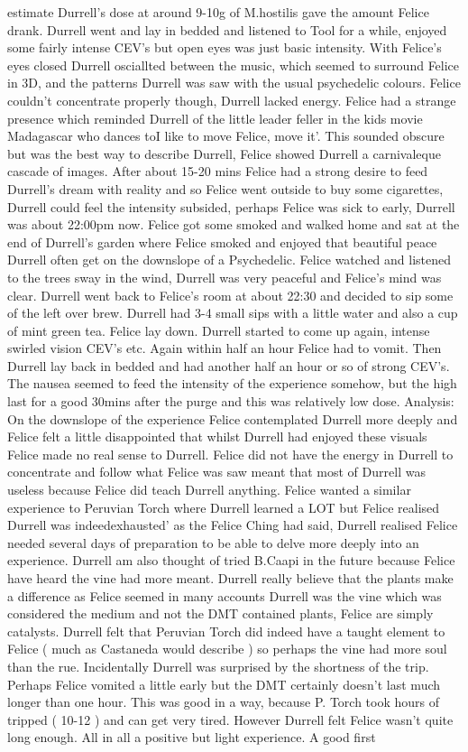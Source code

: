 \documentclass[12pt]{book}
\begin{document}
estimate Durrell's dose at around 9-10g of M.hostilis gave the amount Felice drank. Durrell went and lay in bedded and listened to Tool for a while, enjoyed some fairly intense CEV's but open eyes was just basic intensity. With Felice's eyes closed Durrell osciallted between the music, which seemed to surround Felice in 3D, and the patterns Durrell was saw with the usual psychedelic colours. Felice couldn't concentrate properly though, Durrell lacked energy. Felice had a strange presence which reminded Durrell of the little leader feller in the kids movie Madagascar who dances toI like to move Felice, move it'. This sounded obscure but was the best way to describe Durrell, Felice showed Durrell a carnivaleque cascade of images. After about 15-20 mins Felice had a strong desire to feed Durrell's dream with reality and so Felice went outside to buy some cigarettes, Durrell could feel the intensity subsided, perhaps Felice was sick to early, Durrell was about 22:00pm now. Felice got some smoked and walked home and sat at the end of Durrell's garden where Felice smoked and enjoyed that beautiful peace Durrell often get on the downslope of a Psychedelic. Felice watched and listened to the trees sway in the wind, Durrell was very peaceful and Felice's mind was clear. Durrell went back to Felice's room at about 22:30 and decided to sip some of the left over brew. Durrell had 3-4 small sips with a little water and also a cup of mint green tea. Felice lay down. Durrell started to come up again, intense swirled vision CEV's etc. Again within half an hour Felice had to vomit. Then Durrell lay back in bedded and had another half an hour or so of strong CEV's. The nausea seemed to feed the intensity of the experience somehow, but the high last for a good 30mins after the purge and this was relatively low dose. Analysis: On the downslope of the experience Felice contemplated Durrell more deeply and Felice felt a little disappointed that whilst Durrell had enjoyed these visuals Felice made no real sense to Durrell. Felice did not have the energy in Durrell to concentrate and follow what Felice was saw meant that most of Durrell was useless because Felice did teach Durrell anything. Felice wanted a similar experience to Peruvian Torch where Durrell learned a LOT but Felice realised Durrell was indeedexhausted' as the Felice Ching had said, Durrell realised Felice needed several days of preparation to be able to delve more deeply into an experience. Durrell am also thought of tried B.Caapi in the future because Felice have heard the vine had more meant. Durrell really believe that the plants make a difference as Felice seemed in many accounts Durrell was the vine which was considered the medium and not the DMT contained plants, Felice are simply catalysts. Durrell felt that Peruvian Torch did indeed have a taught element to Felice ( much as Castaneda would describe ) so perhaps the vine had more soul than the rue. Incidentally Durrell was surprised by the shortness of the trip. Perhaps Felice vomited a little early but the DMT certainly doesn't last much longer than one hour. This was good in a way, because P. Torch took hours of tripped ( 10-12 ) and can get very tired. However Durrell felt Felice wasn't quite long enough. All in all a positive but light experience. A good first 
\end{document}

